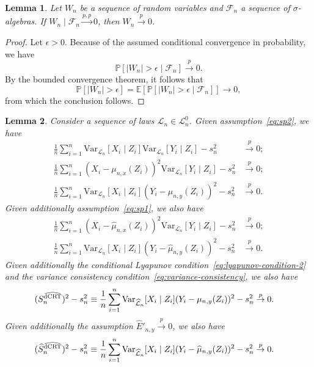 \documentclass[12pt]{article}
\newtheorem{lemma}{Lemma}
\theoremstyle{definition}
\theoremstyle{remark}
\newcommand{\E}{\mathbb E}								%
\newcommand{\V}{\mathrm{Var}}							%
\renewcommand{\P}{\mathbb{P}}							%
\newcommand{\convp}{\overset p \rightarrow}             %
\newcommand{\srx}{X}									%
\newcommand{\srz}{Z}									%
\newcommand{\sry}{Y}									%
\newcommand{\law}{\mathcal L}							%
\newcommand{\nulllaws}{\mathscr L^0}					%
\newcommand{\lawhat}{\widehat{\mathcal L}}				%
\newcommand{\dCRThat}{\widehat{\textnormal{dCRT}}}		%
\newcommand{\convpp}{\overset {p,p} \longrightarrow}    %
\begin{document}
\begin{lemma} \label{lem:conditional-convergence-to-unconditional}
	Let $W_n$ be a sequence of random variables and $\mathcal F_n$ a sequence of $\sigma$-algebras. If $W_n \mid \mathcal F_n \convpp 0$, then $W_n \convp 0$. 
\end{lemma}

\begin{proof}
	Let $\epsilon > 0$. Because of the assumed conditional convergence in probability, we have
	\begin{equation*}
	\P[|W_n| > \epsilon \mid \mathcal F_n] \convp 0.
	\end{equation*}
	By the bounded convergence theorem, it follows that
	\begin{equation*}
	\P[|W_n| > \epsilon] = \E[\P[|W_n| > \epsilon \mid \mathcal F_n]] \rightarrow 0,
	\end{equation*}
	from which the conclusion follows.
\end{proof}

\begin{lemma}
	\label{lem:variance_convg}
	Consider a sequence of laws $\law_n \in \nulllaws_n$. Given assumption~\eqref{eq:sp2}, we have
	\begin{align}
	\frac{1}{n} \sum_{i=1}^n \V_{\law_n}[\srx_i\mid \srz_i]\V_{\law_n}[\sry_i \mid \srz_i] -s^2_n &\convp 0; \label{eq:variance_convg_1} \\ 
	\frac{1}{n}\sum_{i = 1}^n (\srx_i - \mu_{n,x}(\srz_i))^2\V_{\law_n}[\sry_i\mid\srz_i]-s^2_n &\convp 0; \label{eq:variance_convg_2} \\
	\frac{1}{n}\sum_{i = 1}^n \V_{\law_n}[\srx_i\mid\srz_i](\sry_i - \mu_{n,y}(\srz_i))^2-s^2_n &\convp 0. \label{eq:variance_convg_3}
	\end{align}
	Given additionally assumption~\eqref{eq:sp1}, we also have
	\begin{align}
	\frac{1}{n} \sum_{i = 1}^n (\srx_i - \widehat \mu_{n,x}(\srz_i))^2\V_{\law_n}[\sry_i\mid\srz_i] - s^2_n &\convp 0; \label{eq:variance_convg_4} \\
	\frac{1}{n}\sum_{i = 1}^n \V_{\law_n}[\srx_i\mid\srz_i](\sry_i - \widehat \mu_{n,y}(\srz_i))^2-s^2_n &\convp 0. \label{eq:variance_convg_5}
	\end{align}
	Given additionally the conditional Lyapunov condition~\eqref{eq:lyapunov-condition-2} and the variance consistency condition~\eqref{eq:variance-consistency}, we also have
	\begin{align}
	(S^{\dCRThat}_n)^2 - s_n^2 \equiv \frac{1}{n}\sum_{i = 1}^n \V_{\lawhat_n}[\srx_i\mid\srz_i](\sry_i - \mu_{n,y}(\srz_i))^2-s^2_n &\convp 0. \label{eq:variance_convg_6}
	\end{align}
	Given additionally the assumption $\widehat E'_{n,y} \convp 0$, we also have
	\begin{align}
		(\widehat S^{\dCRThat}_n)^2 - s_n^2 \equiv \frac{1}{n}\sum_{i = 1}^n \V_{\lawhat_n}[\srx_i\mid\srz_i](\sry_i - \widehat \mu_{n,y}(\srz_i))^2-s^2_n &\convp 0. \label{eq:variance_convg_7}
	\end{align}

\end{lemma}
\end{document}
